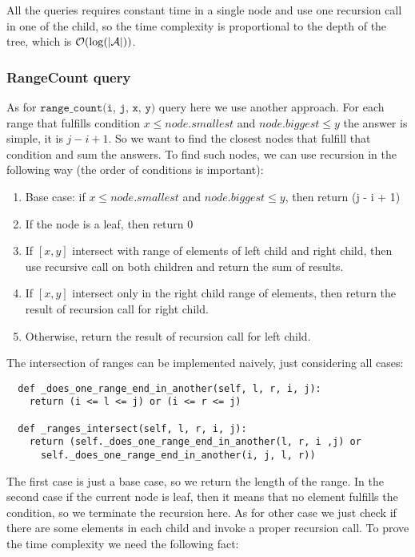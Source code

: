 All the queries requires constant time in a single node and use one recursion call in one of the child, so the time complexity is proportional to the depth of the tree, which is $\mathcal{O}(\log(|\mathcal{A}|))$. 

\subsubsection{RangeCount query}
As for $\texttt{range\_count(i, j, x, y)}$ query here we use another approach. For each range that fulfills condition $x \leq node.smallest$ and $node.biggest \leq y$ the answer is simple, it is $j-i+1$. So we want to find the closest nodes that fulfill that condition and sum the answers. To find such nodes, we can use recursion in the following way (the order of conditions is important):

\begin{enumerate}
    \item Base case: if $x \leq node.smallest$ and $node.biggest \leq y$, then return (j - i + 1)
    \item If the node is a leaf, then return 0
    \item If $[x, y]$ intersect with range of elements of left child and right child, then use recursive call on both children and return the sum of results.
    \item If $[x, y]$ intersect only in the right child range of elements, then return the result of recursion call for right child.
    \item Otherwise, return the result of recursion call for left child.
\end{enumerate}



The intersection of ranges can be implemented naively, just considering all cases:

\begin{verbatim}
  def _does_one_range_end_in_another(self, l, r, i, j):
    return (i <= l <= j) or (i <= r <= j)
    
  def _ranges_intersect(self, l, r, i, j):
    return (self._does_one_range_end_in_another(l, r, i ,j) or
      self._does_one_range_end_in_another(i, j, l, r))
\end{verbatim}

The first case is just a base case, so we return the length of the range. In the second case if the current node is leaf, then it means that no element fulfills the condition, so we terminate the recursion here. As for other case we just check if there are some elements in each child and invoke a proper recursion call. To prove the time complexity we need the following fact:


